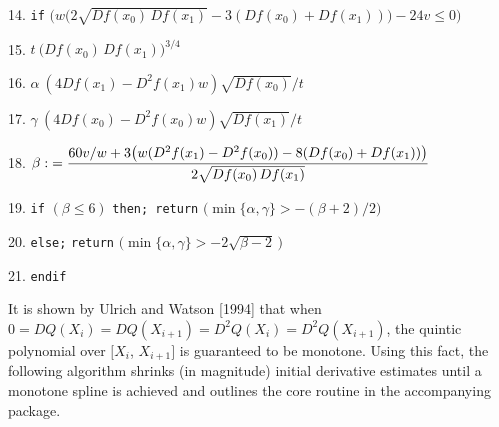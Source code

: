 {\item{14.} {\tt if} $\bigl( w\bigl(2\sqrt{Df(x_0)\,Df(x_1)} - 3(Df(x_0) +
  Df(x_1))\bigr) - 24v \leq 0 \bigr)$
\item{} 
\item{15.} $t \: \bigl(Df(x_0)\, Df(x_1)\bigr)^{3/4}$
\item{16.} $\alpha \: (4 Df(x_1) - D^2f(x_1)w) \sqrt{Df(x_0)} / t$
\item{17.} $\gamma \: (4 Df(x_0) - D^2f(x_0)w) \sqrt{Df(x_1)} / t$
\item{18.} $\displaystyle \beta \: {60v/w + 3\bigl(w(D^2f(x_1) -
  D^2f(x_0)) - 8(Df(x_0) + Df(x_1))\bigr) \over 2 \sqrt{Df(x_0)\,Df(x_1)}}$
\item{19.} {\tt if} $(\beta \leq 6)$ {\tt then; return}
$\bigl( \min\{\alpha,\gamma\} > - (\beta + 2) / 2 \bigr)$
\item{20.} {\tt else;} \hskip 18mm {\tt return}
$\bigl( \min\{\alpha,\gamma\} > -2 \sqrt{\beta - 2}\,\bigr)$
\item{21.} {\tt endif}
}
\vskip 5mm

It is shown by Ulrich and Watson [1994] that when $0 = DQ(X_i) =
DQ(X_{i+1}) = D^2Q(X_i) = D^2Q(X_{i+1})$, the quintic polynomial
over $[X_i$, $X_{i+1}]$ is guaranteed to be monotone. Using this fact, the
following algorithm shrinks (in magnitude) initial derivative estimates
until a monotone spline is achieved and outlines the core routine in the
accompanying package.

